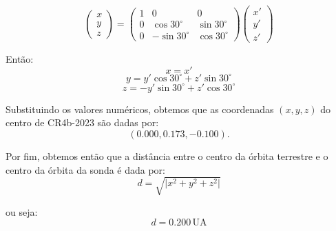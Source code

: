 \documentclass[11pt]{article}
\begin{document}
\begin{pproblem}
\begin{pssolution*}{}{}
\begin{alternativas}
            \[
            \begin{pmatrix}
            x \\
            y \\
            z
            \end{pmatrix}
            =
            \begin{pmatrix}
            1 & 0 & 0 \\
            0 & \cos 30^\circ & \sin 30^\circ \\
            0 & -\sin 30^\circ & \cos 30^\circ
            \end{pmatrix}
            \begin{pmatrix}
            x' \\
            y' \\
            z'
            \end{pmatrix}
            \]

            Então:
            \[
            x = x'
            \]
            \[
            y = y' \cos 30^\circ + z' \sin 30^\circ
            \]
            \[
            z = -y' \sin 30^\circ + z' \cos 30^\circ
            \]

            Substituindo os valores numéricos, obtemos que as coordenadas \((x, y, z)\) do centro de CR4b-2023 são dadas por:
            \[
            (0.000, 0.173, -0.100).
            \]

            Por fim, obtemos então que a distância entre o centro da órbita terrestre e o centro da órbita da sonda é dada por:
            \[
            d = \sqrt{\lvert x^2 + y^2 + z^2 \rvert}
            \]

            ou seja:
            \[
            \boxed{d = 0.200 \, \text{UA}}
            \]
        \end{alternativas}
    \end{pssolution*}
\end{pproblem}
\end{document}

